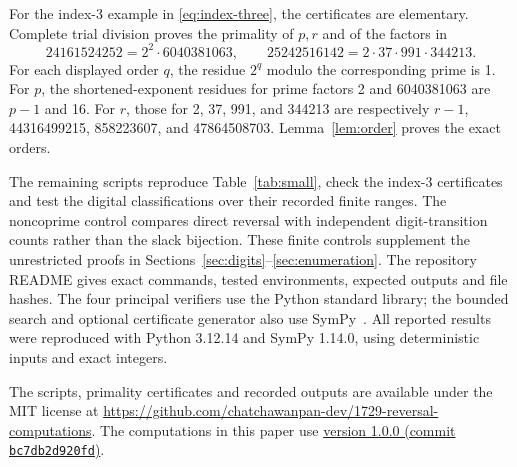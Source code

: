 \documentclass[11pt]{amsart}
\theoremstyle{remark}\newtheorem{remark}[theorem]{Remark}
\begin{document}
For the index-3 example in \eqref{eq:index-three}, the certificates are elementary.
Complete trial division proves the primality of $p,r$ and of the factors in
\[
 24161524252=2^2\cdot6040381063,\qquad
 25242516142=2\cdot37\cdot991\cdot344213.
\]
For each displayed order $q$, the residue $2^q$ modulo the corresponding prime is 1.
For $p$, the shortened-exponent residues for prime factors 2 and 6040381063 are $p-1$ and 16.
For $r$, those for 2, 37, 991, and 344213 are respectively
$r-1$, 44316499215, 858223607, and 47864508703.
Lemma~\ref{lem:order} proves the exact orders.

The remaining scripts reproduce Table~\ref{tab:small}, check the index-3 certificates and test the digital classifications over their recorded finite ranges. The noncoprime control compares direct reversal with independent digit-transition counts rather than the slack bijection. These finite controls supplement the unrestricted proofs in Sections~\ref{sec:digits}--\ref{sec:enumeration}. The repository README gives exact commands, tested environments, expected outputs and file hashes. The four principal verifiers use the Python standard library; the bounded search and optional certificate generator also use SymPy~\cite{SymPy2017}. All reported results were reproduced with Python 3.12.14 and SymPy 1.14.0, using deterministic inputs and exact integers.

\begin{table}[H]
\centering\small
\caption{The complete smaller-order domain. Here $D_k$ is the number of
positive divisors of $2^k-1$, and $E_k$ is the number having exact
base-2 order $k$. The only row with survivors after the reversal
divisibility test is $k=36$, giving \eqref{eq:weak}.}
\label{tab:exhaustive}

\end{table}

The scripts, primality certificates and recorded outputs are available under the MIT license at
\url{https://github.com/chatchawanpan-dev/1729-reversal-computations}. The computations in this paper use \href{https://github.com/chatchawanpan-dev/1729-reversal-computations/tree/bc7db2d920fdf9fde3484f4bceb3183eef999f6b}{version 1.0.0 (commit \texttt{bc7db2d920fd})}.



\end{document}

